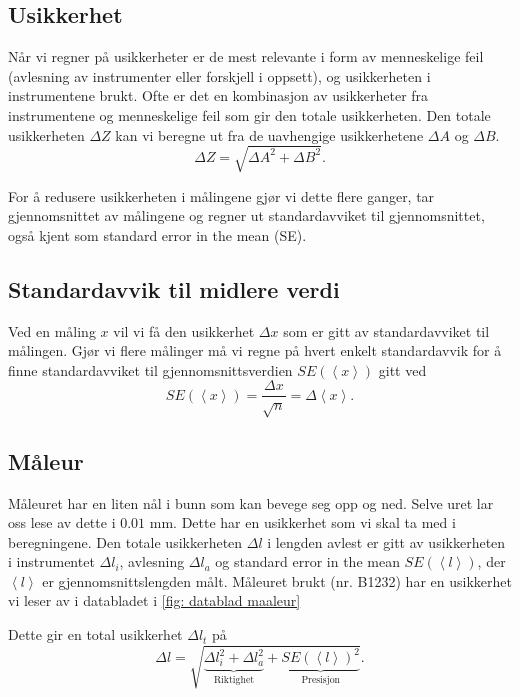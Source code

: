 \documentclass[reprint,norsk,notitlepage]{revtex4-2}
\begin{document}
\subsection{Usikkerhet} \label{ssec: uncertainty}
Når vi regner på usikkerheter er de mest relevante i form av menneskelige feil (avlesning av instrumenter eller forskjell i oppsett), og usikkerheten i instrumentene brukt. Ofte er det en kombinasjon av usikkerheter fra instrumentene og menneskelige feil som gir den totale usikkerheten. Den totale usikkerheten $ΔZ$ kan vi beregne ut fra de uavhengige usikkerhetene $ΔA$ og $ΔB$. 
\begin{equation}\label{eq: uncertainty sum}
    ΔZ = \sqrt{ΔA^2 + ΔB^2}.
\end{equation}
 

For å redusere usikkerheten i målingene gjør vi dette flere ganger, tar gjennomsnittet av målingene og regner ut standardavviket til gjennomsnittet, også kjent som standard error in the mean (SE). 


\subsection{Standardavvik til midlere verdi}
Ved en måling $x$ vil vi få den usikkerhet $Δx$ som er gitt av standardavviket til målingen. Gjør vi flere målinger må vi regne på hvert enkelt standardavvik for å finne standardavviket til gjennomsnittsverdien $SE(\left<x\right>)$ gitt ved 
\begin{equation}\label{eq: SE}
    SE(\left<x\right>) = \frac{Δx}{\sqrt{n}} = Δ\left<x\right>. 
\end{equation}


\subsection{Måleur}
Måleuret har en liten nål i bunn som kan bevege seg opp og ned. Selve uret lar oss lese av dette i $0.01$ mm. Dette har en usikkerhet som vi skal ta med i beregningene. Den totale usikkerheten $Δl$ i lengden avlest er gitt av usikkerheten i instrumentet $Δl_i$, avlesning $Δl_a$  og standard error in the mean $SE(\left<l\right>)$, der $\left<l\right>$ er gjennomsnittslengden målt. Måleuret brukt (nr. B1232)
har en usikkerhet vi leser av i databladet i \cref{fig: datablad maaleur} 

Dette gir en total usikkerhet $Δl_t$ på 
\begin{equation}\label{eq: total length uncertainty}
    Δl = \sqrt{\underbrace{Δl_i^2 + Δl_a^2}_{\text{Riktighet}} + \underbrace{SE(\left<l\right>)^2}_{\text{Presisjon}}}.
\end{equation}
\end{document}
